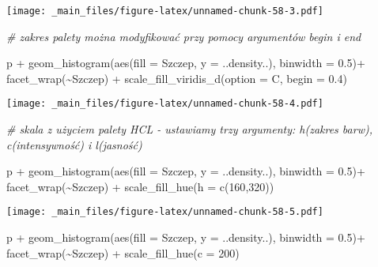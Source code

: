 \documentclass[
]{book}
\newenvironment{Shaded}{\begin{snugshade}}{\end{snugshade}}
\newcommand{\AttributeTok}[1]{\textcolor[rgb]{0.77,0.63,0.00}{#1}}
\newcommand{\CommentTok}[1]{\textcolor[rgb]{0.56,0.35,0.01}{\textit{#1}}}
\newcommand{\DecValTok}[1]{\textcolor[rgb]{0.00,0.00,0.81}{#1}}
\newcommand{\FloatTok}[1]{\textcolor[rgb]{0.00,0.00,0.81}{#1}}
\newcommand{\FunctionTok}[1]{\textcolor[rgb]{0.00,0.00,0.00}{#1}}
\newcommand{\NormalTok}[1]{#1}
\newcommand{\SpecialCharTok}[1]{\textcolor[rgb]{0.00,0.00,0.00}{#1}}
\newcommand{\StringTok}[1]{\textcolor[rgb]{0.31,0.60,0.02}{#1}}
\begin{document}
\texttt{[image: \_main\_files/figure-latex/unnamed-chunk-58-3.pdf]}

\begin{Shaded}
\begin{Highlighting}[]
\CommentTok{\# zakres palety można modyfikować przy pomocy argumentów begin i end}

\NormalTok{p }\SpecialCharTok{+} \FunctionTok{geom\_histogram}\NormalTok{(}\FunctionTok{aes}\NormalTok{(}\AttributeTok{fill =}\NormalTok{ Szczep, }\AttributeTok{y =}\NormalTok{ ..density..), }\AttributeTok{binwidth =} \FloatTok{0.5}\NormalTok{)}\SpecialCharTok{+}
  \FunctionTok{facet\_wrap}\NormalTok{(}\SpecialCharTok{\textasciitilde{}}\NormalTok{Szczep) }\SpecialCharTok{+} \FunctionTok{scale\_fill\_viridis\_d}\NormalTok{(}\AttributeTok{option =} \StringTok{\textquotesingle{}C\textquotesingle{}}\NormalTok{, }\AttributeTok{begin =} \FloatTok{0.4}\NormalTok{)}
\end{Highlighting}
\end{Shaded}

\texttt{[image: \_main\_files/figure-latex/unnamed-chunk-58-4.pdf]}

\begin{Shaded}
\begin{Highlighting}[]
\CommentTok{\# skala z użyciem palety HCL {-} ustawiamy trzy argumenty: h(zakres barw), c(intensywność) i l(jasność)}

\NormalTok{p }\SpecialCharTok{+} \FunctionTok{geom\_histogram}\NormalTok{(}\FunctionTok{aes}\NormalTok{(}\AttributeTok{fill =}\NormalTok{ Szczep, }\AttributeTok{y =}\NormalTok{ ..density..), }\AttributeTok{binwidth =} \FloatTok{0.5}\NormalTok{)}\SpecialCharTok{+}
  \FunctionTok{facet\_wrap}\NormalTok{(}\SpecialCharTok{\textasciitilde{}}\NormalTok{Szczep) }\SpecialCharTok{+} \FunctionTok{scale\_fill\_hue}\NormalTok{(}\AttributeTok{h =} \FunctionTok{c}\NormalTok{(}\DecValTok{160}\NormalTok{,}\DecValTok{320}\NormalTok{))}
\end{Highlighting}
\end{Shaded}

\texttt{[image: \_main\_files/figure-latex/unnamed-chunk-58-5.pdf]}

\begin{Shaded}
\begin{Highlighting}[]
\NormalTok{p }\SpecialCharTok{+} \FunctionTok{geom\_histogram}\NormalTok{(}\FunctionTok{aes}\NormalTok{(}\AttributeTok{fill =}\NormalTok{ Szczep, }\AttributeTok{y =}\NormalTok{ ..density..), }\AttributeTok{binwidth =} \FloatTok{0.5}\NormalTok{)}\SpecialCharTok{+}
  \FunctionTok{facet\_wrap}\NormalTok{(}\SpecialCharTok{\textasciitilde{}}\NormalTok{Szczep) }\SpecialCharTok{+} \FunctionTok{scale\_fill\_hue}\NormalTok{(}\AttributeTok{c =} \DecValTok{200}\NormalTok{)}
\end{Highlighting}
\end{Shaded}
\end{document}
